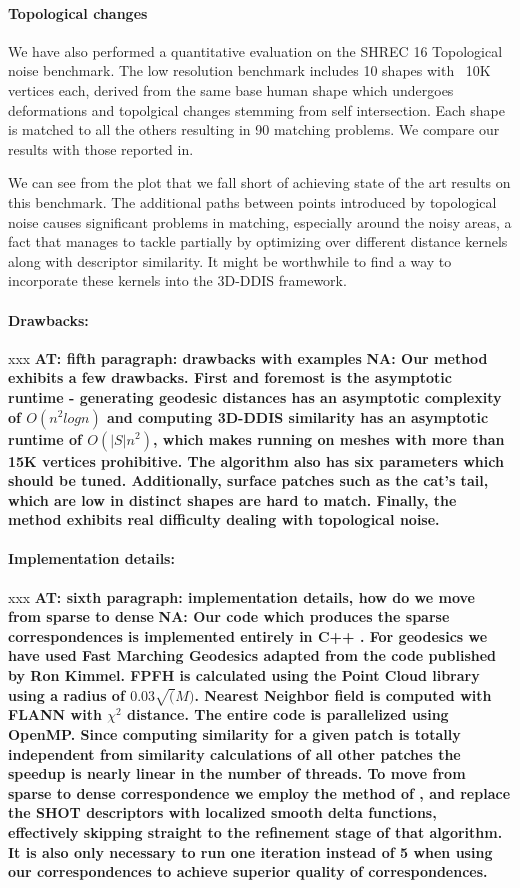 \documentclass[10pt,twocolumn,letterpaper]{article}
\newcommand{\colornote}[3]{{\color{#1}\bf{#2: #3}\normalfont}}
\newcommand{\colornote}[3]{}
\newcommand {\ayellet}[1]{\colornote{blue}{AT}{#1}}
\newcommand {\nadav}[1]{\colornote{red}{NA}{#1}}
\begin{document}
{\paragraph{Topological changes}
We have also performed a quantitative evaluation on the SHREC 16 Topological noise benchmark\cite{lahner2016shrec}. The low resolution benchmark includes 10 shapes with ~10K vertices each, derived from the same base human shape which undergoes deformations and topolgical changes stemming from self intersection. Each shape is matched to all the others resulting in 90 matching problems. We compare our results with those reported in\cite{vestner2017efficient}.

We can see from the plot that we fall short of achieving state of the art results on this benchmark. The additional paths between points introduced by topological noise causes significant problems in matching, especially around the noisy areas, a fact that\cite{vestner2017efficient} manages to tackle partially by optimizing over different distance kernels along with descriptor similarity. It might be worthwhile to find a way to incorporate these kernels into the 3D-DDIS framework.}

\paragraph{Drawbacks:} xxx
\ayellet{fifth paragraph: drawbacks with examples}
\nadav{Our method exhibits a few drawbacks. First and foremost is the asymptotic runtime - generating geodesic distances has an asymptotic complexity of $O(n^2 logn)$ and computing 3D-DDIS similarity has an asymptotic runtime of $O(|S|n^2)$, which makes running on meshes with more than 15K vertices prohibitive. The algorithm  also has six parameters which should be tuned. Additionally, surface patches such as the cat's tail, which are low in distinct shapes are hard to match. Finally, the method exhibits real difficulty dealing with topological noise.}

\paragraph{Implementation details:} xxx
\ayellet{sixth paragraph: implementation details, how do we move from sparse to dense}
\nadav{Our code which produces the sparse correspondences is implemented entirely in C++ . For geodesics we have used Fast Marching Geodesics adapted from the code published by Ron Kimmel.
FPFH is calculated using the Point Cloud library\cite{} using a radius of $0.03\sqrt(M)$. Nearest Neighbor field is computed with FLANN\cite{} with $\chi^2$ distance. 
The entire code is parallelized using OpenMP. Since computing similarity for a given patch is totally independent from similarity calculations of all other patches the speedup is nearly linear in the number of threads.
To move from sparse to dense correspondence we employ the method of \cite{litany2017fully}, and replace the SHOT descriptors with localized smooth delta functions, effectively skipping straight to the refinement stage of that algorithm. It is also only necessary to run one iteration instead of 5 when using our correspondences to achieve superior quality of correspondences.}
\end{document}
